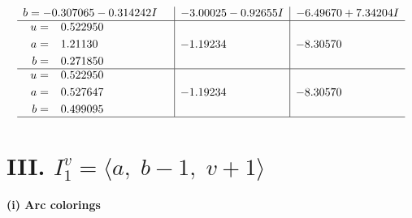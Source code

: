 \documentclass[1p]{elsarticle_modified}
\theoremstyle{definition}
\begin{document}
$$\begin{array}{c|c|c}
\begin{aligned}
b &= -0.307065 - 0.314242 I\end{aligned}
 & -3.00025 - 0.92655 I & -6.49670 + 7.34204 I \\ \hline\begin{aligned}
u &= \phantom{-}0.522950\phantom{ +0.000000I} \\
a &= \phantom{-}1.21130\phantom{ +0.000000I} \\
b &= \phantom{-}0.271850\phantom{ +0.000000I}\end{aligned}
 & -1.19234\phantom{ +0.000000I} & -8.30570\phantom{ +0.000000I} \\ \hline\begin{aligned}
u &= \phantom{-}0.522950\phantom{ +0.000000I} \\
a &= \phantom{-}0.527647\phantom{ +0.000000I} \\
b &= \phantom{-}0.499095\phantom{ +0.000000I}\end{aligned}
 & -1.19234\phantom{ +0.000000I} & -8.30570\phantom{ +0.000000I}\\
 \hline 
 \end{array}$$\newpage\newpage\renewcommand{\arraystretch}{1}
\centering \section*{III. $I^v_{1}= \langle a,\;b-1,\;v+1 \rangle$}
\flushleft \textbf{(i) Arc colorings}\\
\end{document}
